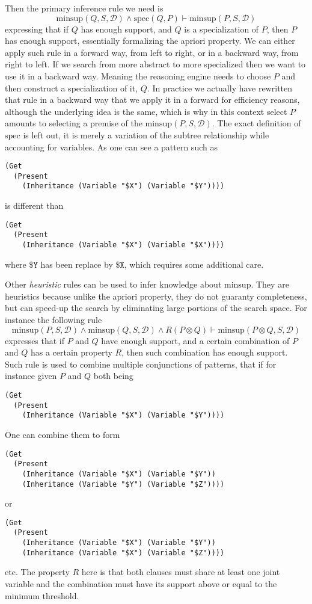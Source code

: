 \documentclass[runningheads]{llncs}
\begin{document}
Then the primary inference rule we need is
$$ \text{minsup}(Q, S, \mathcal{D}) \land \text{spec}(Q, P) \vdash
\text{minsup}(P, S, \mathcal{D})$$ expressing that if $Q$ has enough
support, and $Q$ is a specialization of $P$, then $P$ has enough
support, essentially formalizing the apriori property. We can either
apply such rule in a forward way, from left to right, or in a backward
way, from right to left. If we search from more abstract to more
specialized then we want to use it in a backward way. Meaning the
reasoning engine needs to choose $P$ and then construct a
specialization of it, $Q$.  In practice we actually have rewritten
that rule in a backward way that we apply it in a forward for
efficiency reasons, although the underlying idea is the same, which is
why in this context select $P$ amounts to selecting a premise of the
$\text{minsup}(P, S, \mathcal{D})$. The exact definition of
$\text{spec}$ is left out, it is merely a variation of the subtree
relationship while accounting for variables. As one can see a pattern
such as
\begin{verbatim}
(Get
  (Present
    (Inheritance (Variable "$X") (Variable "$Y"))))
\end{verbatim}
is different than
\begin{verbatim}
(Get
  (Present
    (Inheritance (Variable "$X") (Variable "$X"))))
\end{verbatim}
where $\texttt{\$Y}$ has been replace by $\texttt{\$X}$, which
requires some additional care.

Other \emph{heuristic} rules can be used to infer knowledge about
$\text{minsup}$. They are heuristics because unlike the apriori
property, they do not guaranty completeness, but can speed-up the
search by eliminating large portions of the search space. For instance
the following rule
$$ \text{minsup}(P, S, \mathcal{D}) \land \text{minsup}(Q, S,
\mathcal{D}) \land R(P \otimes Q) \vdash \text{minsup}(P \otimes Q, S,
\mathcal{D}) $$ expresses that if $P$ and $Q$ have enough support, and
a certain combination of $P$ and $Q$ has a certain property $R$, then
such combination has enough support. Such rule is used to combine
multiple conjunctions of patterns, that if for instance given $P$ and
$Q$ both being
\begin{verbatim}
(Get
  (Present
    (Inheritance (Variable "$X") (Variable "$Y"))))
\end{verbatim}
One can combine them to form
\begin{verbatim}
(Get
  (Present
    (Inheritance (Variable "$X") (Variable "$Y"))
    (Inheritance (Variable "$Y") (Variable "$Z"))))
\end{verbatim}
or
\begin{verbatim}
(Get
  (Present
    (Inheritance (Variable "$X") (Variable "$Y"))
    (Inheritance (Variable "$X") (Variable "$Z"))))
\end{verbatim}
etc. The property $R$ here is that both clauses must share at least
one joint variable and the combination must have its support above or
equal to the minimum threshold.
\end{document}

